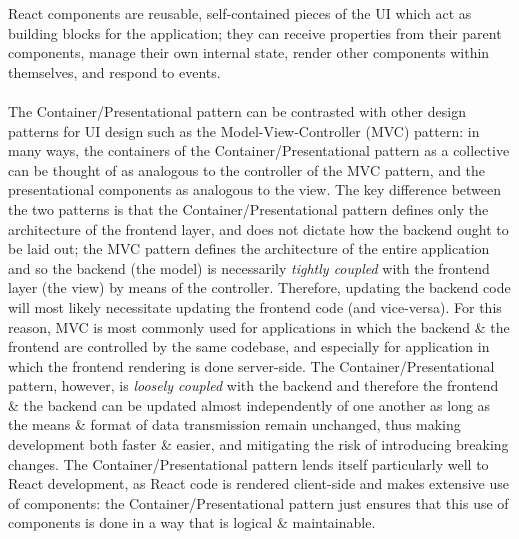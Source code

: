\documentclass[a4paper,11pt]{report}
\begin{document}
React components are reusable, self-contained pieces of the UI which act as building blocks for the application\supercite{reactcomponents};
they can receive properties from their parent components, manage their own internal state, render other components within themselves, and respond to events.
\\\\
The Container/Presentational pattern can be contrasted with other design patterns for UI design such as the Model-View-Controller (MVC) pattern\supercite{reenskaug2003mvc}:
in many ways, the containers of the Container/Presentational pattern as a collective can be thought of as analogous to the controller of the MVC pattern, and the presentational components as analogous to the view.
The key difference between the two patterns is that the Container/Presentational pattern defines only the architecture of the frontend layer, and does not dictate how the backend ought to be laid out;
the MVC pattern defines the architecture of the entire application and so the backend (the model) is necessarily \textit{tightly coupled}\supercite{mcnatt2001coupling} with the frontend layer (the view) by means of the controller.
Therefore, updating the backend code will most likely necessitate updating the frontend code (and vice-versa).
For this reason, MVC is most commonly used for applications in which the backend \& the frontend are controlled by the same codebase, and especially for application in which the frontend rendering is done server-side.
The Container/Presentational pattern, however, is \textit{loosely coupled}\supercite{mcnatt2001coupling} with the backend and therefore the frontend \& the backend can be updated almost independently of one another as long as the means \& format of data transmission remain unchanged, thus making development both faster \& easier, and mitigating the risk of introducing breaking changes.
The Container/Presentational pattern lends itself particularly well to React development, as React code is rendered client-side and makes extensive use of components: the Container/Presentational pattern just ensures that this use of components is done in a way that is logical \& maintainable.
\end{document}
